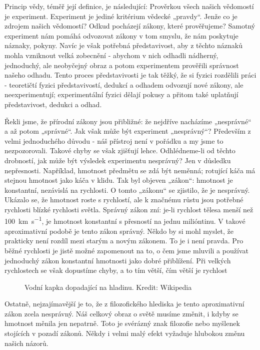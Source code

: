     Princip vědy, téměř její definice, je následující: Prověrkou všech našich vědomostí je 
    experiment. Experiment je jediné kritérium vědecké „pravdy“. Jenže co je zdrojem našich 
    vědomostí? Odkud pocházejí zákony, které prověřujeme? Samotný experiment nám pomáhá odvozovat 
    zákony v tom smyslu, že nám poskytuje náznaky, pokyny. Navíc je však potřebná představivost, 
    aby z těchto náznaků mohla vzniknout velká zobecnění - abychom v nich odhadli nádherný, 
    jednoduchý, ale neobyčejný obraz a potom experimentem prověřili správnost našeho odhadu. Tento 
    proces představivosti je tak těžký, že si fyzici rozdělili práci - teoretičtí fyzici 
    představivostí, dedukcí a odhadem odvozují nové zákony, ale neexperimentují; experimentální 
    fyzici dělají pokusy a přitom také uplatňují představivost, dedukci a odhad.
    
    Řekli jsme, že přírodní zákony jsou přibližné: že nejdříve nacházíme „nesprávné“ a až potom 
    „správné“. Jak však může být experiment „nesprávný“? Především z velmi jednoduchého důvodu - 
    náš přístroj není v pořádku a my jsme to nezpozorovali. Takové chyby se však zjišťují lehce. 
    Odhlédneme-li od těchto drobností, jak může být výsledek experimentu nesprávný? Jen v důsledku 
    nepřesnosti. Například, hmotnost předmětu se zdá být neměnná; rotující káča má stejnou hmotnost 
    jako káča v klidu. Tak byl objeven „zákon“: hmotnost je konstantní, nezávislá na rychlosti. O 
    tomto „zákonu“ se zjistilo, že je nesprávný. Ukázalo se, že hmotnost roste s rychlostí, ale k 
    značnému růstu jsou potřebné rychlosti blízké rychlosti světla. Správný zákon zní: je-li 
    rychlost tělesa menší než \SI{100}{\km\per\second}, je hmotnost konstantní s přesností na jednu 
    milióntinu. V takové aproximativní podobě je tento zákon správný. Někdo by si mohl myslet, že 
    prakticky není rozdíl mezi starým a novým zákonem. To je i není pravda. Pro běžné rychlosti je 
    jistě možné zapomenout na to, o čem jsme mluvili a používat jednoduchý zákon konstantní 
    hmotnosti jako dobré přiblížení. Při velkých rychlostech se však dopustíme chyby, a to tím 
    větší, čím větší je rychlost

    \begin{figure}[ht!]  %
      \centering
      \caption{Vodní kapka dopadající na hladinu. Kredit: Wikipedia}
      \label{fyz:fig891}
    \end{figure} 
    
    Ostatně, nejzajímavější je to, že z filozofického hlediska je tento aproximativní zákon zcela 
    nesprávný. Náš celkový obraz o světě musíme změnit, i kdyby se hmotnost měnila jen nepatrně. 
    Toto je svérázný znak filozofie nebo myšlenek stojících v pozadí zákonů. Někdy i velmi malý 
    efekt vyžaduje hlubokou změnu našich názorů.
    
